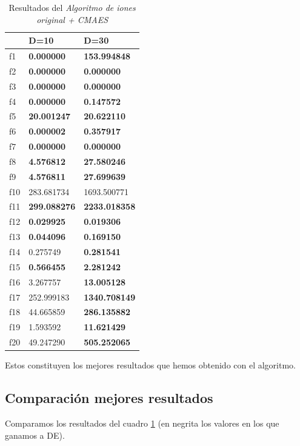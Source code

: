 \documentclass[a4paper,11pt]{article}
\begin{document}
\begin{itemize}
  \begin{table}[H]	
  \caption{Resultados del \textit{Algoritmo de iones original + CMAES}}
  \centering
  \begin{tabular}{|l|l|l|}
  \hline
  & \textbf{D=10} & \textbf{D=30} \\ \hline
  f1 &  \textbf{0.000000} &  \textbf{153.994848} \\ \hline
  f2 &  \textbf{0.000000} &  \textbf{0.000000} \\ \hline
  f3 &  \textbf{0.000000} &  \textbf{0.000000} \\ \hline
  f4 &  \textbf{0.000000} &  \textbf{0.147572} \\ \hline
  f5 &  \textbf{20.001247} &  \textbf{20.622110} \\ \hline
  f6 &  \textbf{0.000002} &  \textbf{0.357917} \\ \hline
  f7 &  \textbf{0.000000} &  \textbf{0.000000} \\ \hline
  f8 &  \textbf{4.576812} &  \textbf{27.580246} \\ \hline
  f9 &  \textbf{4.576811} &  \textbf{27.699639} \\ \hline
  f10 &  283.681734 &  1693.500771 \\ \hline
  f11 &  \textbf{299.088276} &  \textbf{2233.018358} \\ \hline
  f12 &  \textbf{0.029925} &  \textbf{0.019306} \\ \hline
  f13 &  \textbf{0.044096} &  \textbf{0.169150} \\ \hline
  f14 &  0.275749 &  \textbf{0.281541} \\ \hline
  f15 &  \textbf{0.566455} &  \textbf{2.281242} \\ \hline
  f16 &  3.267757 &  \textbf{13.005128} \\ \hline
  f17 &  252.999183 &  \textbf{1340.708149} \\ \hline
  f18 &  44.665859 &  \textbf{286.135882} \\ \hline
  f19 &  1.593592 &  \textbf{11.621429} \\ \hline
  f20 &  49.247290 &  \textbf{505.252065} \\ \hline
  \end{tabular}
  \label{bestres}
  \end{table}
  
  Estos constituyen los mejores resultados que hemos obtenido con el algoritmo.
  
  \subsection{Comparación mejores resultados}
  Comparamos los resultados del cuadro \ref{bestres} (en negrita los valores en los que ganamos a DE).

\end{itemize}
\end{document}
